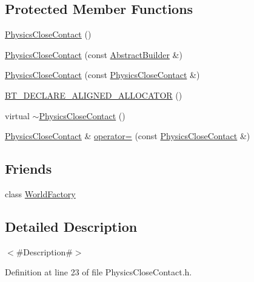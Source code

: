 \subsection*{Protected Member Functions}
\begin{DoxyCompactItemize}
\item 
\mbox{\hyperlink{classnjli_1_1_physics_close_contact_a3fe40ee1f14897d01cf22425d845f8f8}{Physics\+Close\+Contact}} ()
\item 
\mbox{\hyperlink{classnjli_1_1_physics_close_contact_a458752337dd7bee43ba3fdc8d355dfcd}{Physics\+Close\+Contact}} (const \mbox{\hyperlink{classnjli_1_1_abstract_builder}{Abstract\+Builder}} \&)
\item 
\mbox{\hyperlink{classnjli_1_1_physics_close_contact_a50033f6c1da215d908b2265ce0148b20}{Physics\+Close\+Contact}} (const \mbox{\hyperlink{classnjli_1_1_physics_close_contact}{Physics\+Close\+Contact}} \&)
\item 
\mbox{\hyperlink{classnjli_1_1_physics_close_contact_a092b76aa7ae7386952c1bb6b59830c95}{B\+T\+\_\+\+D\+E\+C\+L\+A\+R\+E\+\_\+\+A\+L\+I\+G\+N\+E\+D\+\_\+\+A\+L\+L\+O\+C\+A\+T\+OR}} ()
\item 
virtual \mbox{\hyperlink{classnjli_1_1_physics_close_contact_ab4c3f8b0667ba99662e6ad4f52ac98cf}{$\sim$\+Physics\+Close\+Contact}} ()
\item 
\mbox{\hyperlink{classnjli_1_1_physics_close_contact}{Physics\+Close\+Contact}} \& \mbox{\hyperlink{classnjli_1_1_physics_close_contact_a731270363395fa1154af53a4b9252242}{operator=}} (const \mbox{\hyperlink{classnjli_1_1_physics_close_contact}{Physics\+Close\+Contact}} \&)
\end{DoxyCompactItemize}
\subsection*{Friends}
\begin{DoxyCompactItemize}
\item 
class \mbox{\hyperlink{classnjli_1_1_physics_close_contact_acb96ebb09abe8f2a37a915a842babfac}{World\+Factory}}
\end{DoxyCompactItemize}


\subsection{Detailed Description}
$<$\#\+Description\#$>$ 

Definition at line 23 of file Physics\+Close\+Contact.\+h.



